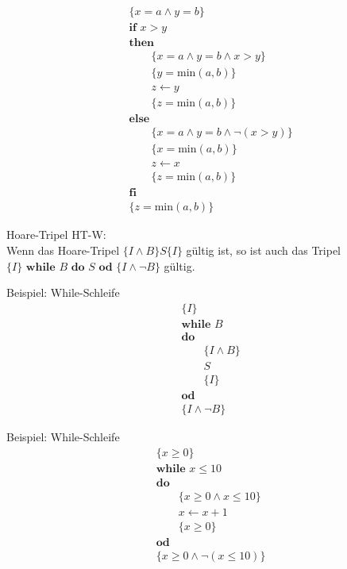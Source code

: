 \begin{frame}
  \begin{minipage}{\textwidth}
    \begin{align*}
      &\{x=a \land y=b\}\\
      &\textbf{if } x > y\\
      &\textbf{then}\\
      & \qquad \{x=a \land y=b \land x>y\}\\
      & \qquad \{y=\text{min}(a,b)\}\\
      & \qquad z \leftarrow y\\
      & \qquad \{z=\text{min}(a,b)\}\\
      &\textbf{else}\\
      & \qquad \{x=a \land y=b \land \lnot(x>y)\}\\
      & \qquad \{x=\text{min}(a,b)\}\\
      & \qquad z \leftarrow x\\
      & \qquad \{z=\text{min}(a,b)\}\\
      &\textbf{fi}\\
      &\{z=\text{min}(a,b)\}
    \end{align*}
  \end{minipage}
\end{frame}

\begin{frame}{Hoare-Tripel}
  HT-W:\\
  Wenn das Hoare-Tripel $\{I \land B\}S\{I\}$ gültig ist, so ist auch das Tripel $\{I\} \textbf{ while } B \textbf{ do }S\textbf{ od }\{I \land \lnot B\}$ gültig.
\end{frame}

\begin{frame}{Beispiel: While-Schleife}
  \begin{align*}
    &\{ I \} \\
    &\textbf{while } B  \\
    &\textbf{do } \\
    &\qquad\{ I\land B \} \\
    &\qquad S \\
    &\qquad\{ I \} \\
    &\textbf{od } \\
    &\{I\land \lnot B\}
  \end{align*}
\end{frame}

\begin{frame}{Beispiel: While-Schleife}
  \begin{align*}
    &\{ x\geq 0 \} \\
    &\textbf{while } x\leq 10  \\
    &\textbf{do } \\
    &\qquad\{ x\geq 0 \land x\leq 10 \} \\
    &\qquad x\leftarrow x+1 \\
    &\qquad\{ x\geq 0 \} \\
    &\textbf{od } \\
    &\{x\geq 0 \land \lnot (x\leq 10)\}
  \end{align*}
\end{frame}

